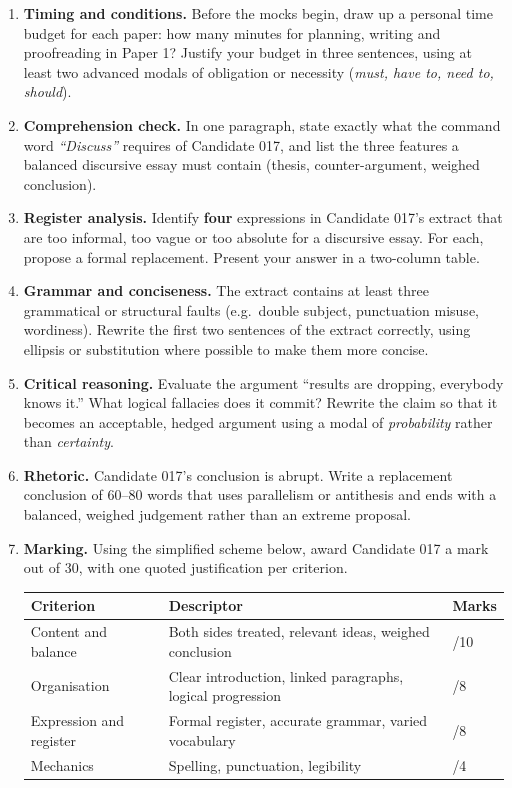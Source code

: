 \documentclass[11pt]{article}
\newcommand{\cle}[1]{{\popxbold\color{popdark}#1}}
\begin{document}
\begin{enumerate}
\item \textbf{Timing and conditions.} Before the mocks begin, draw up a personal time budget for each paper: how many minutes for planning, writing and proofreading in Paper 1? Justify your budget in three sentences, using at least two \cle{advanced modals} of obligation or necessity (\emph{must, have to, need to, should}).

\item \textbf{Comprehension check.} In one paragraph, state exactly what the command word \emph{``Discuss''} requires of Candidate 017, and list the three features a balanced discursive essay must contain (thesis, counter-argument, weighed conclusion).

\item \textbf{Register analysis.} Identify \textbf{four} expressions in Candidate 017's extract that are too informal, too vague or too absolute for a discursive essay. For each, propose a formal replacement. Present your answer in a two-column table.

\item \textbf{Grammar and conciseness.} The extract contains at least three grammatical or structural faults (e.g.\ double subject, punctuation misuse, wordiness). Rewrite the first two sentences of the extract correctly, using \cle{ellipsis} or \cle{substitution} where possible to make them more concise.

\item \textbf{Critical reasoning.} Evaluate the argument ``results are dropping, everybody knows it.'' What logical fallacies does it commit? Rewrite the claim so that it becomes an acceptable, hedged argument using a modal of \emph{probability} rather than \emph{certainty}.

\item \textbf{Rhetoric.} Candidate 017's conclusion is abrupt. Write a replacement conclusion of 60--80 words that uses \cle{parallelism} or \cle{antithesis} and ends with a balanced, weighed judgement rather than an extreme proposal.

\item \textbf{Marking.} Using the simplified scheme below, award Candidate 017 a mark out of 30, with one quoted justification per criterion.

\begin{center}
\begin{tabularx}{\linewidth}{|l|X|l|}
\hline
\rowcolor{popblueL} \textbf{Criterion} & \textbf{Descriptor} & \textbf{Marks} \\
\hline
Content and balance & Both sides treated, relevant ideas, weighed conclusion & /10 \\
\hline
Organisation & Clear introduction, linked paragraphs, logical progression & /8 \\
\hline
Expression and register & Formal register, accurate grammar, varied vocabulary & /8 \\
\hline
Mechanics & Spelling, punctuation, legibility & /4 \\
\hline
\end{tabularx}
\end{center}


\end{enumerate}
\end{document}
